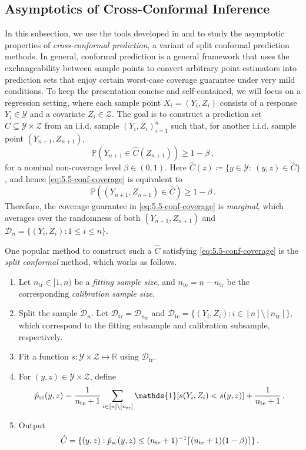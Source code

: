 \documentclass[11pt]{article}
\theoremstyle{plain}
\newcommand{\tr}{{\mathrm{tr}}}
\newcommand{\te}{{\mathrm{te}}}
\newcommand{\D}{{\mathcal{D}}}
\begin{document}
\subsection{Asymptotics of Cross-Conformal Inference}\label{subsec:5.5-cross-conf}
In this subsection, we use the tools developed in  and  to study the asymptotic properties of \emph{cross-conformal prediction}, a variant of split conformal prediction methods.  
In general, conformal prediction is a general framework that uses the exchangeability between sample points to convert arbitrary point estimators into prediction sets that enjoy certain worst-case coverage guarantee under very mild conditions.  To keep the presentation concise and self-contained, we will focus on a regression setting, where each sample point $X_i=(Y_i,Z_i)$ consists of a response $Y_i\in\mathcal Y$ and a covariate $Z_i\in\mathcal Z$. The goal is to construct a prediction set $\hat C\subseteq\mathcal Y\times\mathcal Z$ from an i.i.d. sample $(Y_i,Z_i)_{i=1}^n$ such that, for another i.i.d. sample point $(Y_{n+1},Z_{n+1})$,
\begin{equation}
  \label{eq:5.5-conf-coverage}  
  \mathbb P(Y_{n+1}\in\hat C(Z_{n+1}))\ge 1-\beta\,,
\end{equation}
for a nominal non-coverage level $\beta\in(0,1)$. Here $\hat C(z)\coloneqq\{y\in\mathcal Y:~(y,z)\in\hat C\}$, and hence \eqref{eq:5.5-conf-coverage} is equivalent to 
$$
\mathbb P((Y_{n+1},Z_{n+1})\in\hat C)\ge 1-\beta\,.
$$
Therefore, the coverage guarantee in \eqref{eq:5.5-conf-coverage} is \emph{marginal}, which averages over the randomness of both $(Y_{n+1},Z_{n+1})$ and $\D_n=\{(Y_i,Z_i):1\le i\le n\}$.

One popular method to construct such a $\hat C$ satisfying \eqref{eq:5.5-conf-coverage} is the \emph{split conformal} method, which works as follows.
\begin{enumerate}
\item Let $n_\tr\in[1,n)$ be a \emph{fitting sample size}, and $n_\te = n-n_\tr$ be the corresponding \emph{calibration sample size}.
    \item Split the sample $\D_n$.
    Let $\D_\tr = \D_{n_\tr}$ and $\D_\te = \{(Y_i,Z_i):i\in [n]\setminus[n_\tr]\}$,
     which correspond to the fitting subsample and calibration subsample, respectively.
     \item Fit a function $s:\mathcal Y\times\mathcal Z\mapsto \mathbb R$ using $\D_\tr$.
     \item For $(y,z)\in\mathcal Y\times\mathcal Z$, define
     $$\hat p_{\rm sc}(y,z)=\frac{1}{n_\te+1}\sum_{i\in [n]\setminus[n_\tr]}\mathds{1}[s(Y_i,Z_i)< s(y,z)]+\frac{1}{n_\te+1}\,.$$
     \item  Output 
     \begin{equation*}
     \hat C = \{(y,z): \hat p_{\rm sc}(y,z)\le (n_{\te}+1)^{-1}\lceil(n_
     {\te}+1)(1-\beta)\rceil\}\,.
     \end{equation*}
\end{enumerate}
\end{document}
